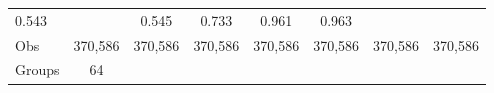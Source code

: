 \documentclass[]{article}
\begin{document}
\begin{longtable}[]{@{}lccccccc@{}}
\begin{minipage}[t]{0.10\columnwidth}
0.543\strut
\end{minipage} & \begin{minipage}[t]{0.10\columnwidth}\centering\strut
\strut
\end{minipage} & \begin{minipage}[t]{0.10\columnwidth}\centering\strut
0.545\strut
\end{minipage} & \begin{minipage}[t]{0.10\columnwidth}\centering\strut
0.733\strut
\end{minipage} & \begin{minipage}[t]{0.10\columnwidth}\centering\strut
0.961\strut
\end{minipage} & \begin{minipage}[t]{0.10\columnwidth}\centering\strut
0.963\strut
\end{minipage}\tabularnewline
\begin{minipage}[t]{0.12\columnwidth}\raggedright\strut
Obs\strut
\end{minipage} & \begin{minipage}[t]{0.09\columnwidth}\centering\strut
370,586\strut
\end{minipage} & \begin{minipage}[t]{0.10\columnwidth}\centering\strut
370,586\strut
\end{minipage} & \begin{minipage}[t]{0.10\columnwidth}\centering\strut
370,586\strut
\end{minipage} & \begin{minipage}[t]{0.10\columnwidth}\centering\strut
370,586\strut
\end{minipage} & \begin{minipage}[t]{0.10\columnwidth}\centering\strut
370,586\strut
\end{minipage} & \begin{minipage}[t]{0.10\columnwidth}\centering\strut
370,586\strut
\end{minipage} & \begin{minipage}[t]{0.10\columnwidth}\centering\strut
370,586\strut
\end{minipage}\tabularnewline
\begin{minipage}[t]{0.12\columnwidth}\raggedright\strut
Groups\strut
\end{minipage} & \begin{minipage}[t]{0.09\columnwidth}\centering\strut
64\strut
\end{minipage} & \begin{minipage}[t]{0.10\columnwidth}\centering\strut

\end{minipage}
\end{longtable}
\end{document}
